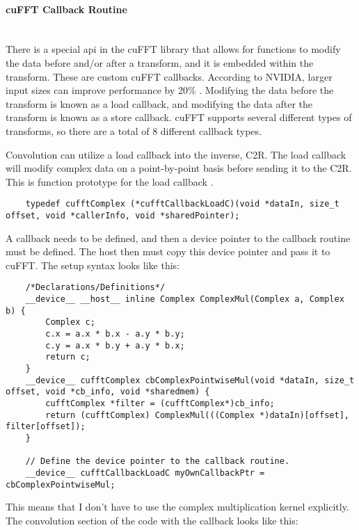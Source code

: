 \paragraph{cuFFT Callback Routine} \hspace{0pt} \\
\indent There is a special \gls{api} in the cuFFT library that allows for functions to modify the data before and/or after a transform, and it is embedded within the transform. These are custom cuFFT callbacks. According to NVIDIA, larger input sizes can improve performance by 20\% \citep{cufft_callbacks}. Modifying the data before the transform is known as a load callback, and modifying the data after the transform is known as a store callback. cuFFT supports several different types of transforms, so there are a total of 8 different callback types. 

Convolution can utilize a load callback into the inverse, C2R. The load callback will modify complex data on a point-by-point basis before sending it to the C2R. This is function prototype for the load callback \citep{cufft}.

\begin{verbatim}
    typedef cufftComplex (*cufftCallbackLoadC)(void *dataIn, size_t offset, void *callerInfo, void *sharedPointer);
\end{verbatim}

A callback needs to be defined, and then a device pointer to the callback routine must be defined. The host then must copy this device pointer and pass it to cuFFT. The setup syntax looks like this:
\begin{verbatim}
    /*Declarations/Definitions*/
    __device__ __host__ inline Complex ComplexMul(Complex a, Complex b) {
    	Complex c;
    	c.x = a.x * b.x - a.y * b.y;
    	c.y = a.x * b.y + a.y * b.x;
    	return c;
    }
    __device__ cufftComplex cbComplexPointwiseMul(void *dataIn, size_t offset, void *cb_info, void *sharedmem) {
	    cufftComplex *filter = (cufftComplex*)cb_info;
	    return (cufftComplex) ComplexMul(((Complex *)dataIn)[offset], filter[offset]);
	}
	
    // Define the device pointer to the callback routine. 
    __device__ cufftCallbackLoadC myOwnCallbackPtr = cbComplexPointwiseMul;
\end{verbatim}

This means that I don't have to use the complex multiplication kernel explicitly. The convolution section of the code with the callback looks like this:

